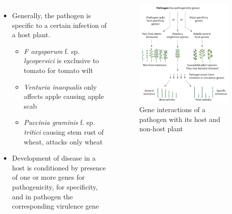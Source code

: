 \documentclass[11pt,dvipsnames,ignorenonframetext,aspectratio=169]{beamer}
\begin{document}
\begin{frame}{}
\protect\hypertarget{section-11}{}
\begin{columns}[T, onlytextwidth]
\begin{itemize}
\small
\item Generally, the pathogen is specific to a certain infection of a host plant.
  \begin{itemize}
  \footnotesize
  \item \textit{F oxysporum} f. sp. \textit{lycopersici} is exclusive to tomato for tomato wilt
  \item \textit{Venturia inaequalis} only affects apple causing apple scab
  \item \textit{Puccinia graminis} f. sp. \textit{tritici} causing stem rust of wheat, attacks only wheat
  \end{itemize}
\item Development of disease in a host is conditioned by presence of one or more genes for pathogenicity, for specificity, and in pathogen the corresponding virulence gene
\end{itemize}


\begin{figure}
\includegraphics[width=0.7\linewidth]{../images/host_non_host} \caption{Gene interactions of a pathogen with its host and non-host plant}\label{fig:pathogen-host-non-host-interaction}
\end{figure}

\end{columns}
\end{frame}
\end{document}
